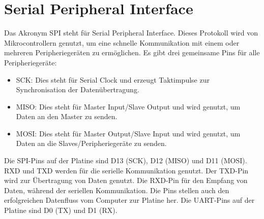 %
%
%

\chapter{Serial Peripheral Interface}

Das Akronym SPI steht für Serial Peripheral Interface. Dieses Protokoll wird von Mikrocontrollern genutzt, um eine schnelle Kommunikation mit einem oder mehreren Peripheriegeräten zu ermöglichen. Es gibt drei gemeinsame Pins für alle Peripheriegeräte:

\begin{itemize}
  \item SCK: Dies steht für Serial Clock und erzeugt Taktimpulse zur Synchronisation der Datenübertragung.
  \item  MISO: Dies steht für Master Input/Slave Output und wird genutzt, um Daten an den Master zu senden.
  \item MOSI: Dies steht für Master Output/Slave Input und wird genutzt, um Daten an die Slaves/Peripheriegeräte zu senden.
\end{itemize}

Die SPI-Pins auf der Platine sind D13 (SCK), D12 (MISO) und D11 (MOSI). RXD und TXD werden für die serielle Kommunikation genutzt.
Der TXD-Pin wird zur Übertragung von Daten genutzt. Die RXD-Pin für den Empfang von Daten, während der seriellen Kommunikation. Die Pins stellen auch den erfolgreichen Datenfluss vom Computer zur Platine her. Die UART-Pins auf der Platine sind D0 (TX) und D1 (RX).